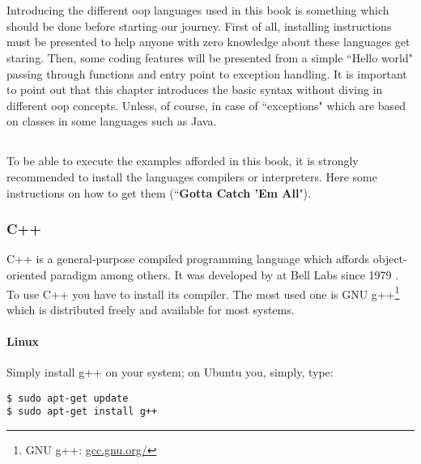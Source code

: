 \documentclass{KodeBookAr}
\begin{document}
\fi

\chapter{}

\begin{introduction}
	 
	Introducing the different \ac{oop} languages used in this book is something which should be done before starting our journey.
	First of all, installing instructions must be presented to help anyone with zero knowledge about these languages get staring. 
	Then, some coding features will be presented from a simple ``Hello world" passing through functions and entry point to exception handling. 
	It is important to point out that this chapter introduces the basic syntax without diving in different \ac{oop} concepts.
	Unless, of course, in case of ``exceptions" which are based on classes in some languages such as Java.
\end{introduction}


\section{}

To be able to execute the examples afforded in this book, it is strongly recommended to install the languages compilers or interpreters.
Here some instructions on how to get them (``\textbf{Gotta Catch 'Em All}").

\subsection{C++}


C++ is a general-purpose compiled programming language which affords object-oriented paradigm among others. 
It was developed by  at Bell Labs since 1979 \citep{1993-stroustrup}.
To use C++ you have to install its compiler. 
The most used one is GNU g++\footnote{GNU g++: \url{gcc.gnu.org/}} which is distributed freely and available for most systems.

\subsubsection{Linux}
Simply install g++ on your system; on Ubuntu you, simply, type:
\begin{lstlisting}[style=shellStyle]
$ sudo apt-get update
$ sudo apt-get install g++
\end{lstlisting}
\end{document}
